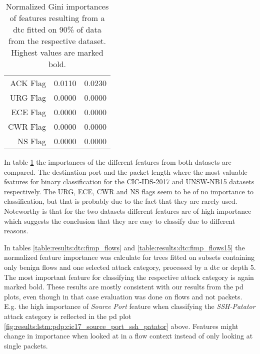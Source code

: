 \begin{table}[]
\begin{tabular}{r|c|c}
		ACK Flag          & 0.0110                                                                   & 0.0230                                                                \\
		URG Flag          & 0.0000                                                                   & 0.0000                                                                \\
		ECE Flag          & 0.0000                                                                   & 0.0000                                                                \\
		CWR Flag          & 0.0000                                                                   & 0.0000                                                                \\
		NS Flag           & 0.0000                                                                   & 0.0000                                                               
	\end{tabular}
	\label{table:results:explainability:feature_importance_datasets_90}
	\caption{Normalized Gini importances of features resulting from a \gls{dtc} fitted on 90\% of data from the respective dataset. Highest values are marked bold.}
\end{table}

In table \ref{table:results:explainability:feature_importance_datasets_90} the importances of the different features from both datasets are compared. The destination port and the packet length where the most valuable features for binary classification for the CIC-IDS-2017 and UNSW-NB15 datasets respectively. The URG, ECE, CWR and NS flags seem to be of no importance to classification, but that is probably due to the fact that they are rarely used. Noteworthy is that for the two datasets different features are of high importance which suggests the conclusion that they are easy to classify due to different reasons. \par





In tables \ref{table:results:dtc:fimp_flows} and \ref{table:results:dtc:fimp_flows15} the normalized feature importance was calculate for trees fitted on subsets containing only benign flows and one selected attack category, processed by a \gls{dtc} or depth 5. The most important feature for classifying the respective attack category is again marked bold. These results are mostly consistent with our results from the \gls{pd} plots, even though in that case evaluation was done on flows and not packets. E.g. the high importance of \textit{Source Port} feature when classifying the \textit{SSH-Patator} attack category is reflected in the \gls{pd} plot  \ref{fig:results:lstm:pdp:cic17_source_port_ssh_patator} above. Features might change in importance when looked at in a flow context instead of only looking at single packets.

\newpage
